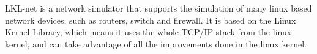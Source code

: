 
LKL-net is a network simulator that supports the simulation of
many linux based network devices, such as routers, switch and
firewall. It is based on the Linux Kernel Library, which means
it uses the whole TCP/IP stack from the linux kernel, and can
take advantage of all the improvements done in the linux kernel.
